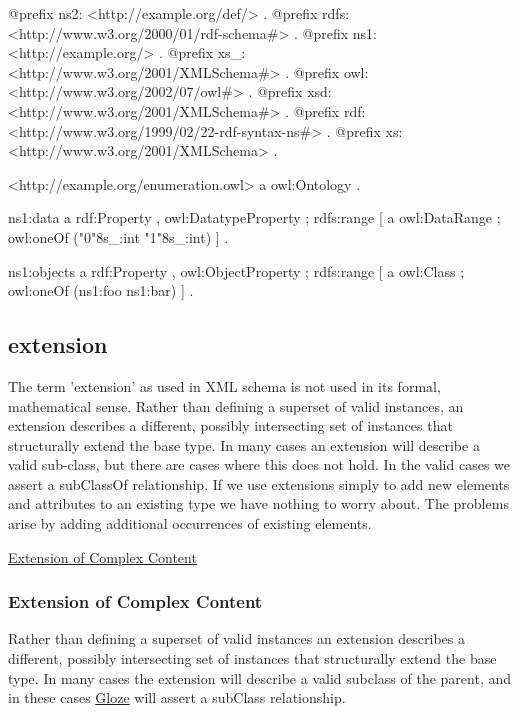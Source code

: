 \begin{DoxyCodeInclude}
@prefix ns2:     <http://example.org/def/> .
@prefix rdfs:    <http://www.w3.org/2000/01/rdf-schema#> .
@prefix ns1:     <http://example.org/> .
@prefix xs_:     <http://www.w3.org/2001/XMLSchema#> .
@prefix owl:     <http://www.w3.org/2002/07/owl#> .
@prefix xsd:     <http://www.w3.org/2001/XMLSchema#> .
@prefix rdf:     <http://www.w3.org/1999/02/22-rdf-syntax-ns#> .
@prefix xs:      <http://www.w3.org/2001/XMLSchema> .

<http://example.org/enumeration.owl>
      a       owl:Ontology .

ns1:data
      a       rdf:Property , owl:DatatypeProperty ;
      rdfs:range
              [ a       owl:DataRange ;
                owl:oneOf ("0"^^xs_:int "1"^^xs_:int)
              ] .

ns1:objects
      a       rdf:Property , owl:ObjectProperty ;
      rdfs:range
              [ a       owl:Class ;
                owl:oneOf (ns1:foo ns1:bar)
              ] .
\end{DoxyCodeInclude}
 \hypertarget{extension}{}\subsection{extension}\label{extension}
The term 'extension' as used in XML schema is not used in its formal, mathematical sense. Rather than defining a superset of valid instances, an extension describes a different, possibly intersecting set of instances that structurally extend the base type. In many cases an extension will describe a valid sub-\/class, but there are cases where this does not hold. In the valid cases we assert a subClassOf relationship. If we use extensions simply to add new elements and attributes to an existing type we have nothing to worry about. The problems arise by adding additional occurrences of existing elements.


\begin{DoxyItemize}
\item \hyperlink{extensioncomplexcontent}{Extension of Complex Content} 
\end{DoxyItemize}\hypertarget{extensionComplexContent}{}\subsubsection{Extension of Complex Content}\label{extensionComplexContent}
Rather than defining a superset of valid instances an extension describes a different, possibly intersecting set of instances that structurally extend the base type. In many cases the extension will describe a valid subclass of the parent, and in these cases \hyperlink{classcom_1_1hp_1_1gloze_1_1_gloze}{Gloze} will assert a subClass relationship.

